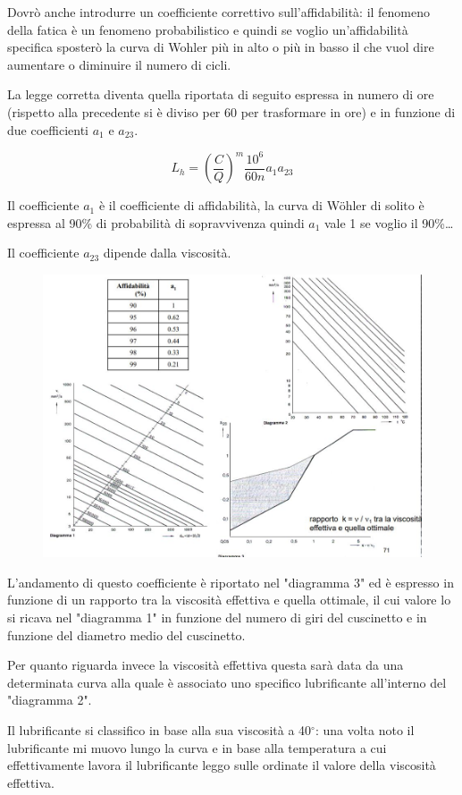 \documentclass[a4paper, 15pt]{article}
\begin{document}
			Dovrò anche introdurre un coefficiente correttivo sull’affidabilità: il fenomeno della fatica è un fenomeno probabilistico e quindi se voglio un’affidabilità specifica sposterò la curva di Wohler più in alto o più in basso il che vuol dire aumentare o diminuire il numero di cicli. \newline 
			
			La legge corretta diventa quella riportata di seguito espressa in numero di ore (rispetto alla precedente si è diviso per 60 per trasformare in ore) e in funzione di due coefficienti $a_1$ e $a_{23}$. 
			
			\[L_h = \left(\dfrac{C}{Q}\right)^m\dfrac{10^6}{60n}a_1a_{23}\]
			
			Il coefficiente $a_1$ è il coefficiente di affidabilità, la curva di Wöhler di solito è espressa al 90\% di probabilità di sopravvivenza quindi $a_1$ vale 1 se voglio il 90\%\dots
			
			Il coefficiente $a_{23}$ dipende dalla viscosità. 
			\begin{figure}[H]
				\centering
				\includegraphics[width=0.7\linewidth]{immagini/screenshot022}
				\label{fig:screenshot022}
			\end{figure}
			L’andamento di questo coefficiente è riportato nel "diagramma 3" ed è espresso in funzione di un rapporto tra la viscosità effettiva e quella ottimale, il cui valore lo si ricava nel "diagramma 1" in funzione del numero di giri del cuscinetto e in funzione del diametro medio del cuscinetto.
			
			Per quanto riguarda invece la viscosità effettiva questa sarà data da una determinata curva alla quale è associato uno specifico lubrificante all'interno del "diagramma 2". 
			
			Il lubrificante si classifico in base alla sua viscosità a 40$^\circ$: una volta noto il lubrificante mi muovo lungo la curva e in base alla temperatura a cui effettivamente lavora il lubrificante leggo sulle ordinate il valore della viscosità effettiva. \newline
			
\end{document}
